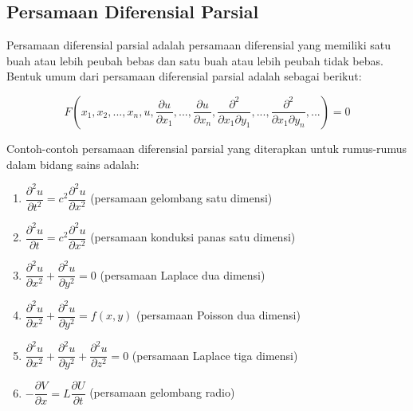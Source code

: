 \subsection{Persamaan Diferensial Parsial}
\label{sec:PDP}

Persamaan diferensial parsial adalah persamaan diferensial yang memiliki satu buah atau lebih peubah bebas dan satu buah atau lebih peubah tidak bebas. Bentuk umum dari persamaan diferensial parsial adalah sebagai berikut:

\begin{equation} F(x_1, x_2, ... , x_n, u, \dfrac{\partial u}{\partial x_1}, ...,  \dfrac{\partial u}{\partial x_n}, \dfrac{\partial^{2}}{\partial x_1 \partial y_1}, ..., \dfrac{\partial^{2}}{\partial x_1 \partial y_n} ,...) = 0 \end{equation}

Contoh-contoh persamaan diferensial parsial yang diterapkan untuk rumus-rumus dalam bidang sains adalah:

\begin{enumerate}[1.]

	\item \begin{math} \dfrac{\partial^{2} u}{\partial t^{2}} = c^{2} \dfrac{\partial^{2} u}{\partial x^{2}} \end{math} (persamaan gelombang satu dimensi)
	\item \begin{math} \dfrac{\partial^{2} u}{\partial t} = c^{2} \dfrac{\partial^{2} u}{\partial x^{2}} \end{math} (persamaan konduksi panas satu dimensi)
	\item \begin{math} \dfrac{\partial^{2} u}{\partial x^{2}} + \dfrac{\partial^{2} u}{\partial y^{2}} = 0 \end{math} (persamaan Laplace dua dimensi)
	\item \begin{math} \dfrac{\partial^{2} u}{\partial x^{2}} + \dfrac{\partial^{2} u}{\partial y^{2}} = f(x, y) \end{math} (persamaan Poisson dua dimensi)
	\item \begin{math} \dfrac{\partial^{2} u}{\partial x^{2}} + \dfrac{\partial^{2} u}{\partial y^{2}} + \dfrac{\partial^{2} u}{\partial z^{2}} = 0 \end{math} (persamaan Laplace tiga dimensi)
	\item \begin{math} -\dfrac{\partial V}{\partial x} = L \dfrac{\partial U}{\partial t} \end{math} (persamaan gelombang radio)

\end{enumerate}

